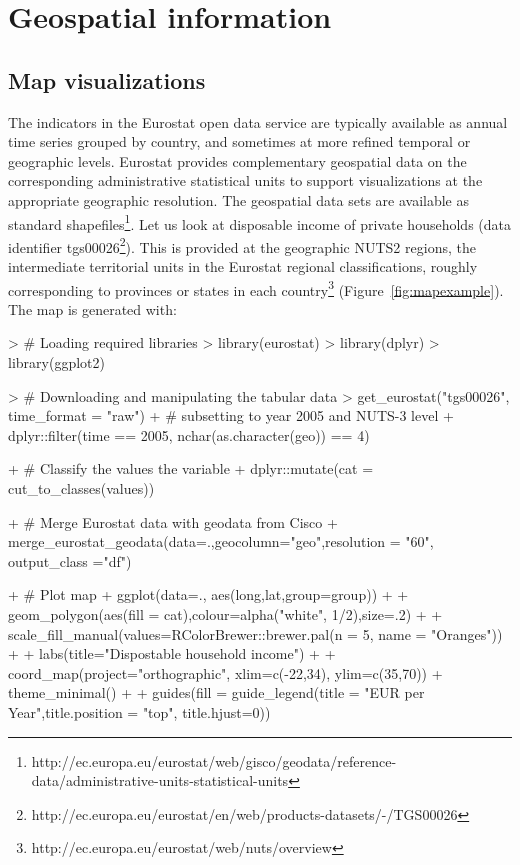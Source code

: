\section{Geospatial information}

\subsection{Map visualizations}

The indicators in the Eurostat open data service are typically
available as annual time series grouped by country, and sometimes at
more refined temporal or geographic levels. Eurostat provides
complementary geospatial data on the corresponding administrative
statistical units to support visualizations at the appropriate
geographic resolution. The geospatial data sets are available as
standard
shapefiles\footnote{http://ec.europa.eu/eurostat/web/gisco/geodata/reference-data/administrative-units-statistical-units}. Let
us look at disposable income of private households (data identifier
tgs00026\footnote{http://ec.europa.eu/eurostat/en/web/products-datasets/-/TGS00026}). This
is provided at the geographic NUTS2 regions, the intermediate
territorial units in the Eurostat regional classifications, roughly
corresponding to provinces or states in each
country\footnote{http://ec.europa.eu/eurostat/web/nuts/overview}
(Figure~\ref{fig:mapexample}). The map is generated with:

\begin{example}
> # Loading required libraries
> library(eurostat)
> library(dplyr)
> library(ggplot2)

> # Downloading and manipulating the tabular data
> get_eurostat("tgs00026", time_format = "raw") %
+   # subsetting to year 2005 and NUTS-3 level
+   dplyr::filter(time == 2005, nchar(as.character(geo)) == 4) %

+   # Classify the values the variable
+   dplyr::mutate(cat = cut_to_classes(values)) %

+   # Merge Eurostat data with geodata from Cisco
+   merge_eurostat_geodata(data=.,geocolumn="geo",resolution = "60", output_class ="df") %

+   # Plot map
+   ggplot(data=., aes(long,lat,group=group)) +
+   geom_polygon(aes(fill = cat),colour=alpha("white", 1/2),size=.2) +
+   scale_fill_manual(values=RColorBrewer::brewer.pal(n = 5, name = "Oranges")) +
+   labs(title="Dispostable household income") +
+   coord_map(project="orthographic", xlim=c(-22,34), ylim=c(35,70)) + theme_minimal() +
+   guides(fill = guide_legend(title = "EUR per Year",title.position = "top", title.hjust=0))
\end{example}


